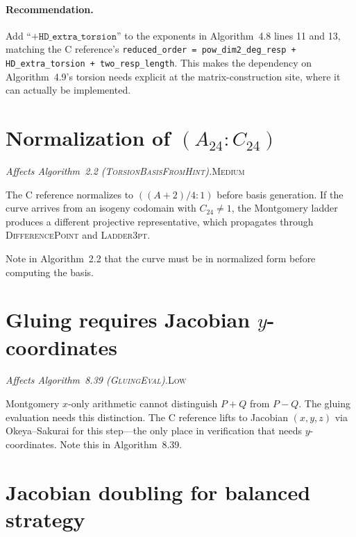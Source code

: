 \documentclass[a4paper,11pt]{article}
\newcommand{\algo}[1]{Algorithm~#1}
\newcommand{\medium}{\textsc{\color{RoyalBlue}Medium}}
\newcommand{\low}{\textsc{\color{OliveGreen}Low}}
\newcommand{\finding}[2]{\noindent\textit{#1}\hfill#2\par\smallskip}
\begin{document}
\paragraph{Recommendation.}  Add ``$+ \texttt{HD\_extra\_torsion}$''
to the exponents in \algo{4.8} lines 11 and 13, matching the C
reference's \texttt{reduced\_order = pow\_dim2\_deg\_resp +
HD\_extra\_torsion + two\_resp\_length}.  This makes the dependency
on \algo{4.9}'s torsion needs explicit at the matrix-construction
site, where it can actually be implemented.

\section{Normalization of $(A_{24} : C_{24})$}
\label{sec:normalize-a24}

\finding{Affects \algo{2.2}
(\textsc{TorsionBasisFromHint}).}{\medium}

The C reference normalizes to $((A{+}2)/4 : 1)$ before basis generation.
If the curve arrives from an isogeny codomain with $C_{24} \neq 1$, the
Montgomery ladder produces a different projective representative, which
propagates through \textsc{DifferencePoint} and \textsc{Ladder3pt}.

Note in \algo{2.2} that the curve must be in normalized form before
computing the basis.

\section{Gluing requires Jacobian $y$-coordinates}
\label{sec:gluing-jacobian}

\finding{Affects \algo{8.39} (\textsc{GluingEval}).}{\low}

Montgomery $x$-only arithmetic cannot distinguish $P+Q$ from $P-Q$.  The
gluing evaluation needs this distinction.  The C reference lifts to
Jacobian $(x,y,z)$ via Okeya--Sakurai for this step---the only place in
verification that needs $y$-coordinates.  Note this in \algo{8.39}.

\section{Jacobian doubling for balanced strategy}
\label{sec:jacobian-doubling}
\end{document}
